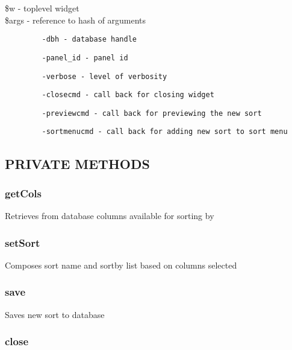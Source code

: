 \documentclass{article}
\begin{document}
\begin{description}

\item[{\$w - toplevel widget}] \mbox{}
\item[{\$args - reference to hash of arguments}] \mbox{}\begin{verbatim}
   -dbh - database handle
\end{verbatim}
\begin{verbatim}
   -panel_id - panel id
\end{verbatim}
\begin{verbatim}
   -verbose - level of verbosity
\end{verbatim}
\begin{verbatim}
   -closecmd - call back for closing widget
\end{verbatim}
\begin{verbatim}
   -previewcmd - call back for previewing the new sort
\end{verbatim}
\begin{verbatim}
   -sortmenucmd - call back for adding new sort to sort menu
\end{verbatim}
\end{description}
\subsection*{PRIVATE METHODS\label{BuildSort_PRIVATE_METHODS}}
\subsubsection*{getCols\label{BuildSort_getCols}}


Retrieves from database columns available for sorting by

\subsubsection*{setSort\label{BuildSort_setSort}}


Composes sort name and sortby list based on columns selected

\subsubsection*{save\label{BuildSort_save}}


Saves new sort to database

\subsubsection*{close\label{BuildSort_close}}
\end{document}
